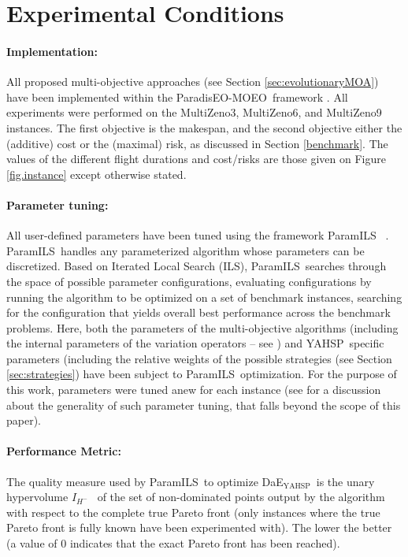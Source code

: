 \documentclass{llncs}
\newcommand{\DAEYAHSP}{{\sc DaE$_{\text{YAHSP}}$}}
\def\PARADISEO{{\sc ParadisEO-MOEO}}
\def\YAHSP{{\sc YAHSP}}
\def\MULTIZENO{{\sc MultiZeno}}
\def\PARAMILS{{\sc ParamILS}}
\begin{document}
\section{Experimental Conditions}
\label{sec:condition}
\paragraph{Implementation:} All proposed multi-objective approaches (see Section \ref{sec:evolutionaryMOA}) have been implemented within the \PARADISEO\ framework \cite{paradiseo}. 
All experiments were performed on the \MULTIZENO3,  \MULTIZENO6, and  \MULTIZENO9 instances. The first objective is the makespan, and the second objective either the (additive) cost or the (maximal) risk, as discussed in Section \ref{benchmark}. The values of the different flight durations and cost/risks are those given on Figure \ref{fig.instance} except otherwise stated.

\paragraph{Parameter tuning:} All user-defined parameters have been tuned using the  framework \PARAMILS\
\cite{ParamILS-JAIR}.  \PARAMILS\ handles any parameterized algorithm whose parameters can be discretized. Based on Iterated Local Search (ILS), \PARAMILS\ searches
through the space of possible parameter configurations, evaluating configurations by running the algorithm to be optimized on a set of benchmark instances, searching for the configuration that yields
overall best performance across the benchmark problems. Here, both the parameters of the multi-objective algorithms (including the internal parameters of the variation operators -- see \cite{Bibai:2010:GPT:1830483.1830528}) and \YAHSP\ specific parameters (including the relative weights of the possible strategies (see Section \ref{sec:strategies}) have been subject to \PARAMILS\ optimization. For the purpose of this work, parameters were tuned anew for each instance (see \cite{Bibai:2010:GPT:1830483.1830528} for a discussion about the generality of such parameter tuning, that falls beyond the scope of this paper).

\paragraph{Performance Metric:} The quality measure used by \PARAMILS\ to optimize \DAEYAHSP\ is the unary hypervolume  $I_{H^-}$~\cite{Zitzler2004} of the set of non-dominated points output by the algorithm with respect to the complete true Pareto front (only instances where the true Pareto front is fully known have been experimented with). The lower the better (a value of 0 indicates that the exact Pareto front has been reached). 
\end{document}
